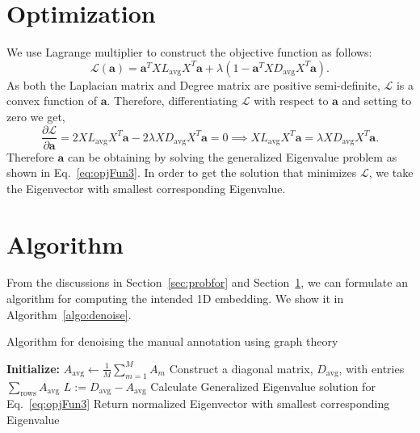 \documentclass{article} \usepackage{nips14submit_e,times}
\begin{document}
\section{Optimization}\label{sec:opt}
We use Lagrange multiplier to construct the objective function as follows:
\begin{equation}
\mathcal{L}(\mathbf{a}) =  \mathbf{a}^T X L_{\text{avg}} X^T \mathbf{a} + \lambda (1 - \mathbf{a}^TX D_{\text{avg}} X^T \mathbf{a}).
\label{eq:opjFun2}
\end{equation} 
As both the Laplacian matrix and Degree matrix are positive semi-definite, $\mathcal{L}$ is a convex function of $\mathbf{a}$. Therefore, differentiating $\mathcal{L}$ with respect to $\mathbf{a}$ and setting to zero we get,  
\begin{equation}
\frac{\partial \mathcal{L}}{\partial \mathbf{a}} =  2X L_{\text{avg}} X^T \mathbf{a} - 2\lambda X D_{\text{avg}} X^T \mathbf{a}  = 0 \implies X L_{\text{avg}} X^T \mathbf{a} = \lambda X D_{\text{avg}} X^T \mathbf{a}.
\label{eq:opjFun3}
\end{equation}
Therefore $\mathbf{a}$ can be obtaining by solving the generalized Eigenvalue problem as shown in Eq.~\eqref{eq:opjFun3}. In order to get the solution that minimizes $\mathcal{L}$, we take the Eigenvector with smallest corresponding Eigenvalue.

\section{Algorithm}
From the discussions in Section~\ref{sec:probfor} and Section~\ref{sec:opt}, we can formulate an algorithm for computing the intended 1D embedding. We show it in Algorithm~\ref{algo:denoise}.
\begin{algorithm}[t]
 \caption{Algorithm for denoising the manual annotation using graph theory}\label{algo:denoise}
  \textbf{Initialize:}\;
  $A_{\text{avg}} \leftarrow \frac{1}{M}\sum_{m=1}^{M} A_m$\;
  Construct a diagonal matrix, $D_{\text{avg}}$, with entries $\sum_{\text{rows}}A_{\text{avg}}$\;
  $L:= D_{\text{avg}} - A_{\text{avg}}$\;
  Calculate Generalized Eigenvalue solution for Eq.~\eqref{eq:opjFun3}\;
  Return normalized Eigenvector with smallest corresponding Eigenvalue\;
\end{algorithm}
\end{document}
